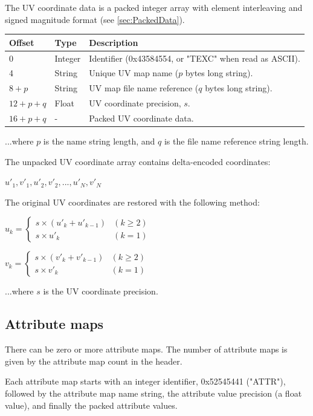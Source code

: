 The UV coordinate data is a packed integer array with element interleaving
and signed magnitude format (see \ref{sec:PackedData}).

\begin{tabular}{|l|l|l|}\hline
\textbf{Offset} &  \textbf{Type} & \textbf{Description}\\ \hline
0 & Integer & Identifier (0x43584554, or "TEXC" when read as ASCII).\\ \hline
4 & String & Unique UV map name ($p$ bytes long string).\\ \hline
$8+p$ & String & UV map file name reference ($q$ bytes long string).\\ \hline
$12+p+q$ & Float & UV coordinate precision, $s$.\\ \hline
$16+p+q$ & - & Packed UV coordinate data.\\ \hline
\end{tabular}

...where $p$ is the name string length, and $q$ is the file name reference string
length.

The unpacked UV coordinate array contains delta-encoded coordinates:

$u'_1, v'_1, u'_2, v'_2, ..., u'_N, v'_N$

The original UV coordinates are restored with the following method:

$u_k = \begin{cases}
s \times (u'_k + u'_{k-1}) & (k \geq 2)\\
s \times u'_k & (k = 1)
\end{cases}$

$v_k = \begin{cases}
s \times (v'_k + v'_{k-1}) & (k \geq 2)\\
s \times v'_k & (k = 1)
\end{cases}$

...where $s$ is the UV coordinate precision.

\subsection{Attribute maps}
There can be zero or more attribute maps. The number of attribute maps is given by the
attribute map count in the header.

Each attribute map starts with an integer identifier, 0x52545441 ("ATTR"), followed
by the attribute map name string, the attribute value precision (a float value), and
finally the packed attribute values.

